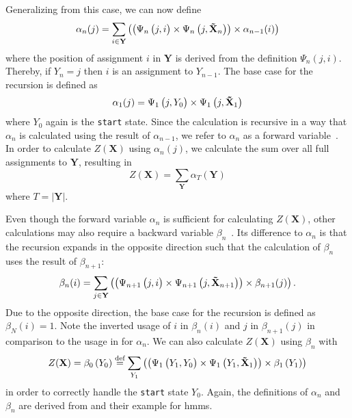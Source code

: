Generalizing from this case, we can now define
\begin{equation}
  \label{equ:linear-chain-crf-z-alpha}
  \alpha_n(j) = \sum_{i\in\mathbf{Y}}\left(\left(\Psi_n\left(\vphantom{\tilde{X}}j,i\right)\times\Psi_n\left(j,\mathbf{\tilde{X}}_n\right)\right)\times \alpha_{n-1}(i)\right)
\end{equation}
where the position of assignment $i$ in $\mathbf{Y}$ is derived from the definition $\Psi_n(j,i)$.
Thereby, if $Y_n=j$ then $i$ is an assignment to $Y_{n-1}$.
The base case for the recursion is defined as
\begin{equation}
  \label{equ:linear-chain-crf-z-alpha-base}
 \alpha_1(j) = \Psi_1\left(\vphantom{\tilde{X}}j,Y_0\right)\times\Psi_1\left(j,\mathbf{\tilde{X}}_1\right)
\end{equation}
where $Y_0$ again is the \texttt{start} state. Since the calculation is recursive in a way that $\alpha_n$ is calculated using the result of $\alpha_{n-1}$, we refer to $\alpha_n$ as a \gls{forward variable}~\citep{sutton2010introduction}. In order to calculate $Z(\mathbf{X})$ using $\alpha_n(j)$, we calculate the sum over all \glspl{full assignment} to $\mathbf{Y}$, resulting in
\begin{equation}
  \label{equ:linear-chain-crf-z-alpha-sum}
  Z(\mathbf{X})=\sum_{\mathbf{Y}}\alpha_T\left(\mathbf{Y}\right)
\end{equation}
where $T=|\mathbf{Y}|$.
\bigskip

Even though the \gls{forward variable} $\alpha_n$ is sufficient for calculating $Z(\mathbf{X})$, other calculations may also require a \gls{backward variable} $\beta_n$~\citep{sutton2010introduction}. Its difference to $\alpha_n$ is that the recursion expands in the opposite direction such that the calculation of $\beta_n$ uses the result of $\beta_{n+1}$:
\begin{equation}
  \label{equ:linear-chain-crf-z-beta}
  \beta_n(i) = \sum_{j\in\mathbf{Y}}\left(\left(\Psi_{n+1}\left(\vphantom{\tilde{X}}j,i\right)\times\Psi_{n+1}\left(j,\mathbf{\tilde{X}}_{n+1}\right)\right)\times \beta_{n+1}(j)\right).
\end{equation}
Due to the opposite direction, the base case for the recursion is defined as $\beta_N(i)=1$.
Note the inverted usage of $i$ in $\beta_n(i)$ and $j$ in $\beta_{n+1}(j)$ in comparison to the usage in  for $\alpha_n$.
We can also calculate $Z(\mathbf{X})$ using $\beta_n$ with
\begin{equation}
  \label{equ:linear-chain-crf-z-beta-sum}
  Z(\mathbf{X})=\beta_0\left(Y_0\right)\equalsdef\sum_{Y_1}\left(\left(\Psi_1\left(\vphantom{\tilde{X}}Y_1,Y_0\right)\times\Psi_1\left(Y_1,\mathbf{\tilde{X}}_1\right)\right)\times\beta_1\left(Y_1\right)\right)
\end{equation}
in order to correctly handle the \texttt{start} state $Y_0$.
Again, the definitions of $\alpha_n$ and $\beta_n$ are derived from \citet{sutton2010introduction} and their example for \glspl{hmm}.

